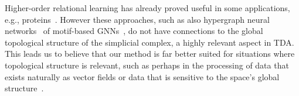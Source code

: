 Higher-order relational learning has already proved useful in some applications, e.g., proteins~\cite{ze2020graph}. However these approaches, such as also hypergraph neural networks~\cite{feng2018hypergraphs} of motif-based GNNs~\cite{monti2018motif}, do not have connections to the global topological structure of the simplicial complex, a highly relevant aspect in TDA. 
This leads us to believe that our method is far better suited for situations where topological structure is relevant, such as perhaps in the processing of data that exists naturally as vector fields or data that is sensitive to the space's global structure~\cite{deepsphere}.
